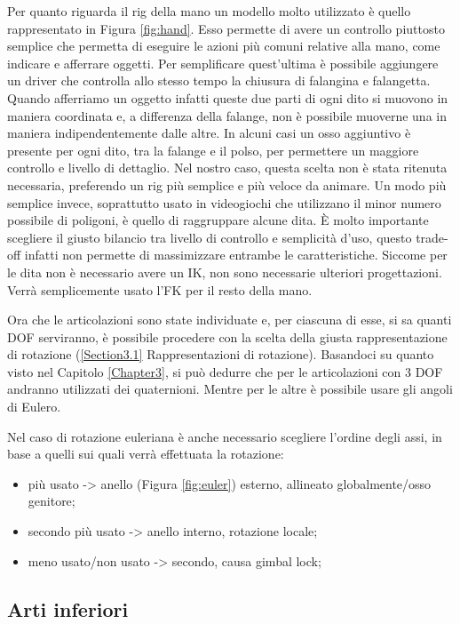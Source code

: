 \newpage
Per quanto riguarda il rig della mano un modello molto utilizzato è quello rappresentato in Figura \ref{fig:hand}.
Esso permette di avere un controllo piuttosto semplice che permetta di eseguire le azioni più comuni relative alla mano, come indicare e afferrare oggetti.
Per semplificare quest'ultima è possibile aggiungere un driver che controlla allo stesso tempo la chiusura di falangina e falangetta.
Quando afferriamo un oggetto infatti queste due parti di ogni dito si muovono in maniera coordinata e, a differenza della falange, non è possibile muoverne una in maniera indipendentemente dalle altre. 
In alcuni casi un osso aggiuntivo è presente per ogni dito, tra la falange e il polso, per permettere un maggiore controllo e livello di dettaglio.
Nel nostro caso, questa scelta non è stata ritenuta necessaria, preferendo un rig più semplice e più veloce da animare. 
Un modo più semplice invece, soprattutto usato in videogiochi che utilizzano il minor numero possibile di poligoni, è quello di raggruppare alcune dita.
È molto importante scegliere il giusto bilancio tra livello di controllo e semplicità d'uso, questo trade-off infatti non permette di massimizzare entrambe le caratteristiche.
Siccome per le dita non è necessario avere un IK, non sono necessarie ulteriori progettazioni. Verrà semplicemente usato l'FK per il resto della mano.

Ora che le articolazioni sono state individuate e, per ciascuna di esse, si sa quanti DOF serviranno, è possibile procedere con la scelta della giusta rappresentazione di rotazione (\ref{Section3.1} Rappresentazioni di rotazione).
Basandoci su quanto visto nel Capitolo \ref{Chapter3}, si può dedurre che per le articolazioni con 3 DOF andranno utilizzati dei quaternioni. Mentre per le altre è possibile usare gli angoli di Eulero.

Nel caso di rotazione euleriana è anche necessario scegliere l'ordine degli assi, in base a quelli sui quali verrà effettuata la rotazione:
\begin{itemize}
    \item più usato -> anello (Figura \ref{fig:euler}) esterno, allineato globalmente/osso genitore;
    \item secondo più usato -> anello interno, rotazione locale;
    \item meno usato/non usato -> secondo, causa gimbal lock;
\end{itemize}

\newpage
\subsection{Arti inferiori}

